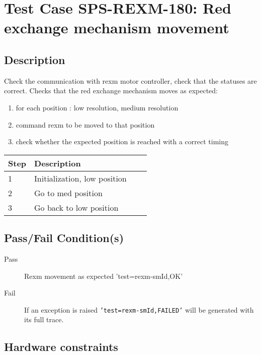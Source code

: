 \section{Test Case SPS-REXM-180: Red exchange mechanism movement}
\subsection{Description}

Check the communication with rexm motor controller, check that the statuses are correct.
Checks that the red exchange mechanism moves as expected:

\begin{enumerate}
    \item for each position : low resolution, medium resolution
        \item command rexm to be moved to that position
        \item check whether the expected position is reached with a correct timing
\end{enumerate}

\begin{table}[H]
    \begin{tabular}{|l| p{5cm} |l| p{5cm} |}
    \hline
    {\bf Step} & {\bf Description}  \\ \hline
    1 & Initialization, low position \\ \hline
    2 & Go to med position \\ \hline
    3 & Go back to low position \\ \hline
    \end{tabular}
\end{table}

\subsection{Pass/Fail Condition(s)}

\begin{description}
\item [Pass] Rexm movement as expected {'test=rexm-smId,OK'}
\item [Fail] If an exception is raised \texttt{'test=rexm-smId,FAILED'} will be generated with its full trace.
\end{description}

\subsection{Hardware constraints}

